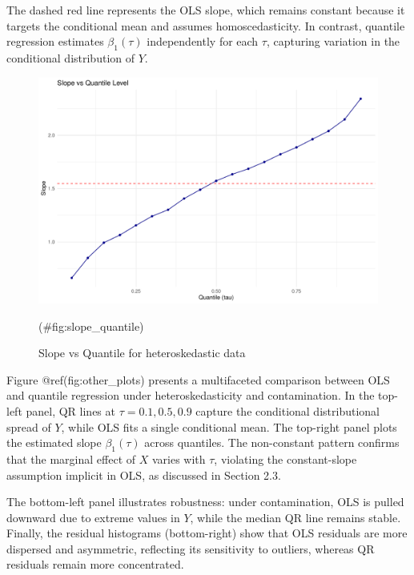 \documentclass[fleqn,10pt]{latex/stylish_article} %
\begin{document}
The dashed red line represents the OLS slope, which remains constant because it targets the conditional mean and assumes homoscedasticity. In contrast, quantile regression estimates \(\beta_1(\tau)\) independently for each \(\tau\), capturing variation in the conditional distribution of \(Y\).

\begin{figure}

{\centering \includegraphics[width=0.8\linewidth]{ADR_project_draft_files/figure-latex/slope_quantile-1} 

}

\caption{Slope vs Quantile for heteroskedastic data}(\#fig:slope_quantile)
\end{figure}

Figure @ref(fig:other\_plots) presents a multifaceted comparison between OLS and quantile regression under heteroskedasticity and contamination. In the top-left panel, QR lines at \(\tau = 0.1, 0.5, 0.9\) capture the conditional distributional spread of \(Y\), while OLS fits a single conditional mean. The top-right panel plots the estimated slope \(\beta_1(\tau)\) across quantiles. The non-constant pattern confirms that the marginal effect of \(X\) varies with \(\tau\), violating the constant-slope assumption implicit in OLS, as discussed in Section 2.3.

The bottom-left panel illustrates robustness: under contamination, OLS is pulled downward due to extreme values in \(Y\), while the median QR line remains stable. Finally, the residual histograms (bottom-right) show that OLS residuals are more dispersed and asymmetric, reflecting its sensitivity to outliers, whereas QR residuals remain more concentrated.
\end{document}
